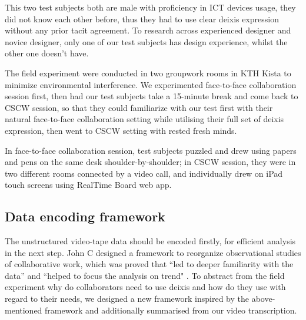 \documentclass[12pt,twoside]{article}
\begin{document}
This two test subjects both are male with proficiency in ICT devices usage, they did not know each other before, thus they had to use clear deixis expression without any prior tacit agreement. To research across experienced designer and novice designer, only one of our test subjects has design experience, whilst the other one doesn't have. 

The field experiment were conducted in two groupwork rooms in KTH Kista to minimize environmental interference. We experimented face-to-face collaboration session first, then had our test subjects take a 15-minute break and come back to CSCW session, so that they could familiarize with our test first with their natural face-to-face collaboration setting while utilising their full set of deixis expression, then went to CSCW setting with rested fresh minds.

In face-to-face collaboration session, test subjects puzzled and drew using papers and pens on the same desk shoulder-by-shoulder; in CSCW session, they were in two different rooms connected by a video call, and individually drew on iPad touch screens using RealTime Board web app.

\subsection{Data encoding framework}
\label{sect:framework}
The unstructured video-tape data should be encoded firstly, for efficient analysis in the next step. John C designed a framework to reorganize observational studies of collaborative work, which was proved that ``led to deeper familiarity with the data” and ``helped to focus the analysis on trend" \cite{tang1991findings}. To abstract from the field experiment why do collaborators need to use deixis and how do they use with regard to their needs, we designed a new framework inspired by the above-mentioned framework and additionally summarised from our video transcription. 
\end{document}
